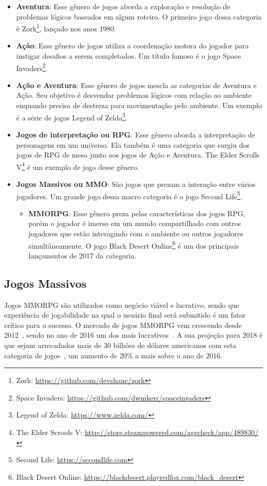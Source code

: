 \begin{itemize}
  \item \textbf{Aventura}: Esse gênero de jogos aborda a exploração e resolução de problemas lógicos baseados em algum roteiro. O primeiro jogo dessa categoria é Zork\footnote{Zork: \url{https://github.com/devshane/zork}}, lançado nos anos 1980.
  \item \textbf{Ação}: Esse gênero de jogos utiliza a coordenação motora do jogador para instigar desafios a serem completados. Um título famoso é o jogo Space Invaders\footnote{Space Invaders: \url{https://github.com/dwmkerr/spaceinvaders}}.
  \item \textbf{Ação e Aventura}: Esse gênero de jogos mescla as categorias de Aventura e Ação. Seu objetivo é desvendar problemas lógicos com relação ao ambiente enquando precisa de destreza para movimentação pelo ambiente. Um exemplo é a série de jogos Legend of Zelda\footnote{Legend of Zelda: \url{https://www.zelda.com/}}.
  \item \textbf{Jogos de interpretação ou \ac{RPG}}: Esse gênero aborda a interpretação de personagens em um universo. Ela também é uma categoria que surgiu dos jogos de \ac{RPG} de mesa junto aos jogos de Ação e Aventura. The Elder Scrolls V\footnote{The Elder Scrools V: \url{http://store.steampowered.com/agecheck/app/489830/}} é um exemplo de jogo desse gênero.
  \item \textbf{Jogos Massivos ou \ac{MMO}}: São jogos que prezam a interação entre vários jogadores. Um grande jogo dessa macro categoria é o jogo Second Life\footnote{Second Life: \url{https://secondlife.com}}.
    \begin{itemize}
      \item \textbf{\ac{MMORPG}}: Esse gênero preza pelas características dos jogos RPG, porém o jogador é imerso em um mundo compartilhado com outros jogadores que estão interagindo com o ambiente ou outros jogadores simultâneamente. O jogo Black Desert Online\footnote{Black Desert Online: \url{https://blackdesert.playredfox.com/black_desert}} é um dos principais lançamentos de 2017 da categoria.
    \end{itemize}
\end{itemize}



\subsection{Jogos Massivos}

Jogos \ac{MMORPG} são utilizados como negócio viável e lucrativo, sendo que experiência de jogabilidade na qual o usuário final será submitido é um fator crítico para o sucesso.
%
O mercado de jogos \ac{MMORPG} vem crescendo desde 2012~\cite{new_york_times}, sendo no ano de 2016 um dos mais lucrativos~\cite{statista_2016}.
%
A sua projeção para 2018 é que sejam arrecadados mais de 30 bilhões de dólares americanos com esta categoria de jogos~\cite{statista_2018}, um aumento de 20\% a mais sobre o ano de 2016.



